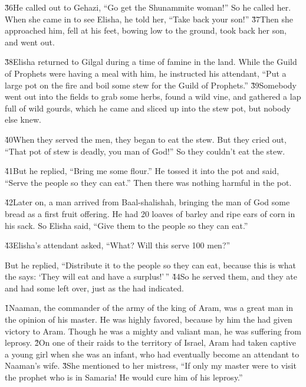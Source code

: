 \v{36}He called out to Gehazi, ``Go get the Shunammite woman!'' So he called her. When she came in to see Elisha, he told her, ``Take back your son!'' \v{37}Then she approached him, fell at his feet, bowing low to the ground, took back her son, and went out.

\v{38}Elisha returned to Gilgal during a time of famine in the land. While the Guild of Prophets were having a meal with him, he instructed his attendant, ``Put a large pot on the fire and boil some stew for the Guild of Prophets.'' \v{39}Somebody went out into the fields to grab some herbs, found a wild vine, and gathered a lap full of wild gourds, which he came and sliced up into the stew pot, but nobody else knew.

\v{40}When they served the men, they began to eat the stew. But they cried out, ``That pot of stew is deadly, you man of God!'' So they couldn't eat the stew.

\v{41}But he replied, ``Bring me some flour.'' He tossed it into the pot and said, ``Serve the people so they can eat.'' Then there was nothing harmful in the pot.

\v{42}Later on, a man arrived from Baal-shalishah, bringing the man of God some bread as a first fruit offering. He had 20 loaves of barley and ripe ears of corn in his sack. So Elisha said, ``Give them to the people so they can eat.''

\v{43}Elisha's attendant asked, ``What? Will this serve 100 men?''

But he replied, ``Distribute it to the people so they can eat, because this is what the  says: `They will eat and have a surplus!'\,'' \v{44}So he served them, and they ate and had some left over, just as the  had indicated.

\v{1}Naaman, the commander of the army of the king of Aram, was a great man in the opinion of his master. He was highly favored, because by him the  had given victory to Aram. Though he was a mighty and valiant man, he was suffering from leprosy. \v{2}On one of their raids to the territory of Israel, Aram had taken captive a young girl when she was an infant, who had eventually become an attendant to Naaman's wife. \v{3}She mentioned to her mistress, ``If only my master were to visit the prophet who is in Samaria! He would cure him of his leprosy.''

